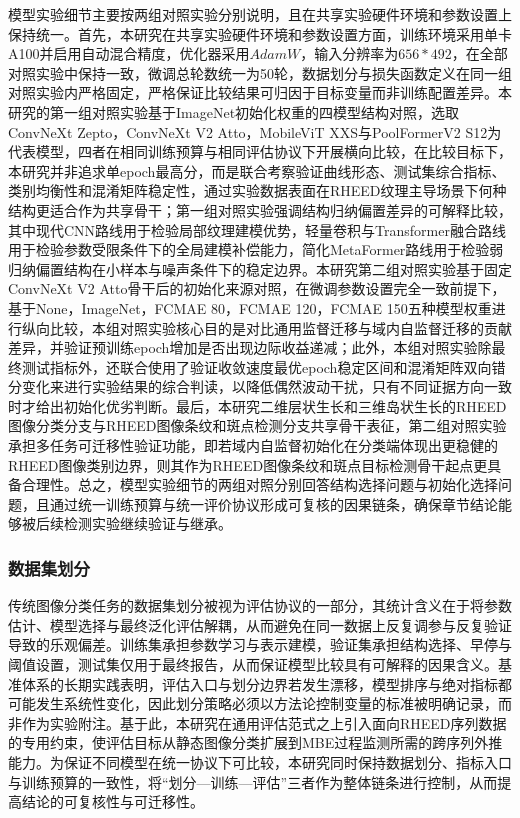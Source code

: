 模型实验细节主要按两组对照实验分别说明，且在共享实验硬件环境和参数设置上保持统一。首先，本研究在共享实验硬件环境和参数设置方面，训练环境采用单卡A100并启用自动混合精度，优化器采用$AdamW$，输入分辨率为$656\ast 492$，在全部对照实验中保持一致，微调总轮数统一为50轮，数据划分与损失函数定义在同一组对照实验内严格固定，严格保证比较结果可归因于目标变量而非训练配置差异。本研究的第一组对照实验基于ImageNet初始化权重的四模型结构对照，选取ConvNeXt Zepto，ConvNeXt V2 Atto，MobileViT XXS与PoolFormerV2 S12为代表模型，四者在相同训练预算与相同评估协议下开展横向比较，在比较目标下，本研究并非追求单epoch最高分，而是联合考察验证曲线形态、测试集综合指标、类别均衡性和混淆矩阵稳定性，通过实验数据表面在RHEED纹理主导场景下何种结构更适合作为共享骨干；第一组对照实验强调结构归纳偏置差异的可解释比较，其中现代CNN路线用于检验局部纹理建模优势，轻量卷积与Transformer融合路线用于检验参数受限条件下的全局建模补偿能力，简化MetaFormer路线用于检验弱归纳偏置结构在小样本与噪声条件下的稳定边界。本研究第二组对照实验基于固定ConvNeXt V2 Atto骨干后的初始化来源对照，在微调参数设置完全一致前提下，基于None，ImageNet，FCMAE 80，FCMAE 120，FCMAE 150五种模型权重进行纵向比较，本组对照实验核心目的是对比通用监督迁移与域内自监督迁移的贡献差异，并验证预训练epoch增加是否出现边际收益递减；此外，本组对照实验除最终测试指标外，还联合使用了验证收敛速度最优epoch稳定区间和混淆矩阵双向错分变化来进行实验结果的综合判读，以降低偶然波动干扰，只有不同证据方向一致时才给出初始化优劣判断。最后，本研究二维层状生长和三维岛状生长的RHEED图像分类分支与RHEED图像条纹和斑点检测分支共享骨干表征，第二组对照实验承担多任务可迁移性验证功能，即若域内自监督初始化在分类端体现出更稳健的RHEED图像类别边界，则其作为RHEED图像条纹和斑点目标检测骨干起点更具备合理性。总之，模型实验细节的两组对照分别回答结构选择问题与初始化选择问题，且通过统一训练预算与统一评价协议形成可复核的因果链条，确保章节结论能够被后续检测实验继续验证与继承。

\subsubsection{数据集划分}
传统图像分类任务的数据集划分被视为评估协议的一部分，其统计含义在于将参数估计、模型选择与最终泛化评估解耦，从而避免在同一数据上反复调参与反复验证导致的乐观偏差。训练集承担参数学习与表示建模，验证集承担结构选择、早停与阈值设置，测试集仅用于最终报告，从而保证模型比较具有可解释的因果含义。基准体系的长期实践表明，评估入口与划分边界若发生漂移，模型排序与绝对指标都可能发生系统性变化，因此划分策略必须以方法论控制变量的标准被明确记录，而非作为实验附注。基于此，本研究在通用评估范式之上引入面向RHEED序列数据的专用约束，使评估目标从静态图像分类扩展到MBE过程监测所需的跨序列外推能力。为保证不同模型在统一协议下可比较，本研究同时保持数据划分、指标入口与训练预算的一致性，将“划分—训练—评估”三者作为整体链条进行控制，从而提高结论的可复核性与可迁移性。

